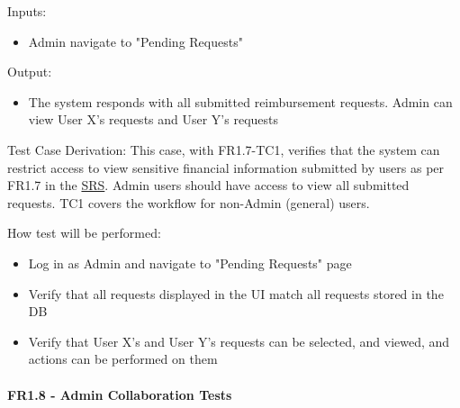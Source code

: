 \documentclass[12pt, titlepage]{article}
\begin{document}
\begin{enumerate}
    Inputs: 
    \begin{itemize}
        \item Admin navigate to "Pending Requests"
    \end{itemize}
    
    Output: 
    \begin{itemize}
        \item The system responds with all submitted reimbursement requests. Admin can view User X's requests and User Y's requests
    \end{itemize}
    
    Test Case Derivation: This case, with FR1.7-TC1, verifies that the system can restrict access to view sensitive financial information submitted by users as per FR1.7 in the \href{https://shorturl.at/FdAgR}{SRS}. Admin users should have access to view all submitted requests. TC1 covers the workflow for non-Admin (general) users.
    
    How test will be performed:
    \begin{itemize}
        \item Log in as Admin and navigate to "Pending Requests" page
        \item Verify that all requests displayed in the UI match all requests stored in the DB
        \item Verify that User X's and User Y's requests can be selected, and viewed, and actions can be performed on them
    \end{itemize}
\end{enumerate}

\paragraph{FR1.8 - Admin Collaboration Tests}
\end{document}

